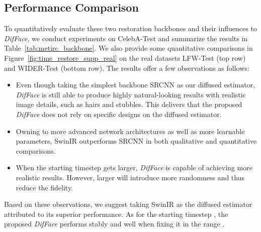 \documentclass[10pt,twocolumn,letterpaper]{article}
\begin{document}
\subsection{Performance Comparison}
To quantitatively evaluate these two restoration backbones and their influences to \textit{DifFace}, we conduct experiments on CelebA-Test and summarize the results in Table~\ref{tab:metirc_backbone}. We also provide some quantitative comparisons in Figure~\ref{fig:time_restore_supp_real} on the real datasets LFW-Test (top row) and WIDER-Test (bottom row). The results offer a few observations as follows:
\begin{itemize}[topsep=0pt,parsep=0pt,leftmargin=18pt]
    \item Even though taking the simplest backbone SRCNN as our diffused estimator, \textit{DifFace}
        is still able to produce highly natural-looking results with realistic image details, such as hairs and
        stubbles. This delivers that the proposed \textit{DifFace} does not rely on specific designs on the
        diffused estimator.
    \item Owning to more advanced network architectures as well as more learnable parameters, SwinIR outperforms
        SRCNN in both qualitative and quantitative comparisons.
    \item When the starting timestep  gets larger, \textit{DifFace} is capable of achieving more realistic results. However,
        larger  will introduce more randomness and thus reduce the fidelity.
\end{itemize}
Based on these observations, we suggest taking SwinIR as the diffused estimator attributed to its superior performance. As for the starting timestep , the proposed \textit{DifFace} performs stably and well when fixing it in the range .
\end{document}
